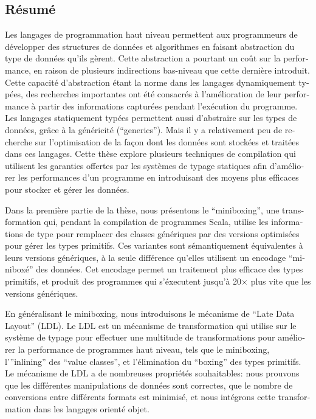 \begin{otherlanguage}{french}
\cleardoublepage
\chapter*{Résumé}

Les langages de programmation haut niveau permettent aux programmeurs de développer des structures de données et algorithmes en faisant abstraction du type de données qu'ils gèrent. Cette abstraction a pourtant un coût sur la performance, en raison de plusieurs indirections bas-niveau que cette dernière introduit. Cette capacité d’abstraction étant la norme dans les langages dynamiquement typées, des recherches importantes ont été consacrés à l'amélioration de leur performance à partir des informations capturées pendant l'exécution du programme. Les langages statiquement typées permettent aussi d’abstraire sur les types de données, grâce à la généricité (“generics”). Mais il y a relativement peu de recherche sur l'optimisation de la façon dont les données sont stockées et traitées dans ces langages. Cette thèse explore plusieurs techniques de compilation qui utilisent les garanties offertes par les systèmes de typage statiques afin d'améliorer les performances d’un programme en introduisant des moyens plus efficaces pour stocker et gérer les données.

\vspace{0.5em}

Dans la première partie de la thèse, nous présentons le “miniboxing”, une transformation qui, pendant la compilation de programmes Scala, utilise les informations de type pour remplacer des classes génériques par des versions optimisées pour gérer les types primitifs. Ces variantes sont sémantiquement équivalentes à leurs versions génériques, à la seule différence qu’elles utilisent un encodage “miniboxé” des données. Cet encodage permet un traitement plus efficace des types primitifs, et produit des programmes qui s'éxecutent jusqu’à 20$\times$ plus vite que les versions génériques.

\vspace{0.5em}

En généralisant le miniboxing, nous introduisons le mécanisme de “Late Data Layout” (LDL). Le LDL est un mécanisme de transformation qui utilise sur le système de typage  pour effectuer une multitude de transformations pour améliorer la performance de programmes haut niveau, tels que le miniboxing, l’”inlining” des “value classes”, et l’élimination du “boxing” des types primitifs. Le mécanisme de LDL a de nombreuses propriétés souhaitables: nous prouvons que les différentes manipulations de données sont correctes, que le nombre de conversions entre différents formats est minimisé, et nous intégrons cette transformation dans les langages orienté objet.


\end{otherlanguage}
